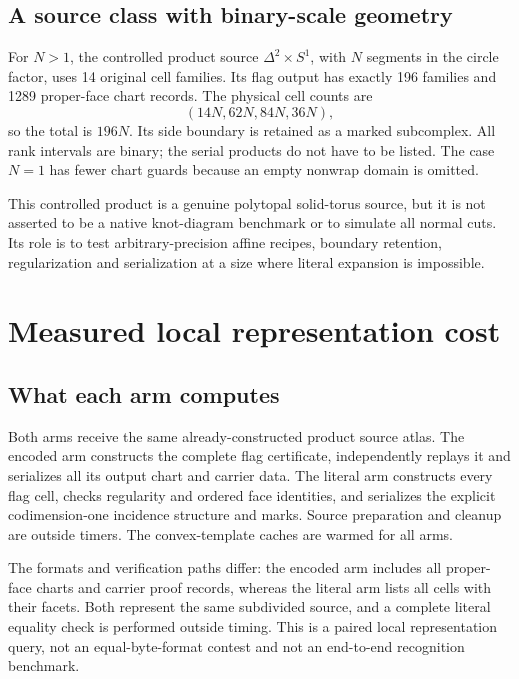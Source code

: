 \documentclass[11pt]{article}
\theoremstyle{definition}\newtheorem{definition}[theorem]{Definition}
\theoremstyle{remark}\newtheorem{remark}[theorem]{Remark}
\begin{document}
\subsection{A source class with binary-scale geometry}
For \(N>1\), the controlled product source \(\Delta^2\times S^1\), with \(N\) segments in the circle factor, uses 14 original cell families. Its flag output has exactly 196 families and 1289 proper-face chart records. The physical cell counts are
\begin{equation}\label{eq:product-count}
                    (14N,62N,84N,36N),
\end{equation}
so the total is \(196N\). Its side boundary is retained as a marked subcomplex. All rank intervals are binary; the serial products do not have to be listed. The case \(N=1\) has fewer chart guards because an empty nonwrap domain is omitted.

This controlled product is a genuine polytopal solid-torus source, but it is not asserted to be a native knot-diagram benchmark or to simulate all normal cuts. Its role is to test arbitrary-precision affine recipes, boundary retention, regularization and serialization at a size where literal expansion is impossible.

\section{Measured local representation cost}
\label{sec:benchmarks}

\subsection{What each arm computes}
Both arms receive the same already-constructed product source atlas. The encoded arm constructs the complete flag certificate, independently replays it and serializes all its output chart and carrier data. The literal arm constructs every flag cell, checks regularity and ordered face identities, and serializes the explicit codimension-one incidence structure and marks. Source preparation and cleanup are outside timers. The convex-template caches are warmed for all arms.

The formats and verification paths differ: the encoded arm includes all proper-face charts and carrier proof records, whereas the literal arm lists all cells with their facets. Both represent the same subdivided source, and a complete literal equality check is performed outside timing. This is a paired local representation query, not an equal-byte-format contest and not an end-to-end recognition benchmark.
\end{document}
